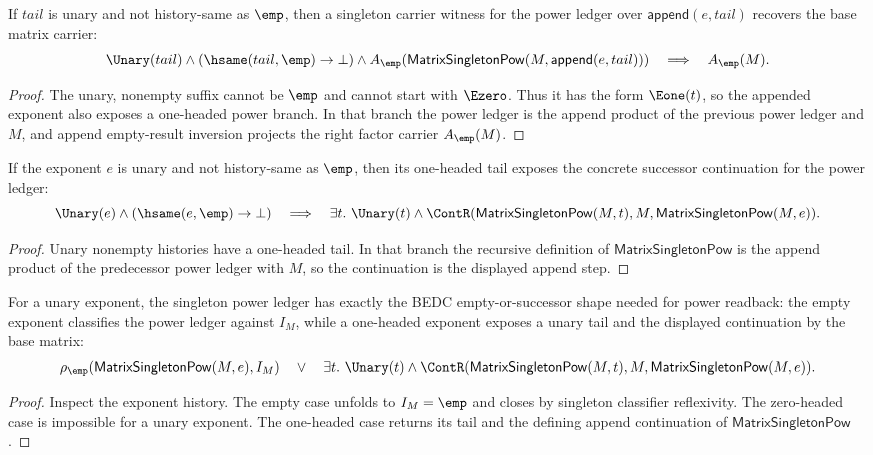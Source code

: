 \begin{theorem}
\label{thm:matrix-singleton-pow-nonempty-unary-suffix-base-carrier}
If $tail$ is unary and not history-same as $\emp$, then a singleton carrier
witness for the power ledger over $\mathsf{append}(e,tail)$ recovers the base
matrix carrier:
$$
\Unary(tail)\land(\hsame(tail,\emp)\to\bot)\land
A_{\emp}(\mathsf{MatrixSingletonPow}(M,\mathsf{append}(e,tail)))
\quad\Longrightarrow\quad
A_{\emp}(M).
$$
\end{theorem}
\begin{proof}
The unary, nonempty suffix cannot be $\emp$ and cannot start with $\Ezero$.
Thus it has the form $\Eone(t)$, so the appended exponent also exposes a
one-headed power branch. In that branch the power ledger is the append product
of the previous power ledger and $M$, and append empty-result inversion
projects the right factor carrier $A_{\emp}(M)$.
\end{proof}

\begin{theorem}
\label{thm:matrix-singleton-pow-positive-exponent-cont-readback}
If the exponent $e$ is unary and not history-same as $\emp$, then its
one-headed tail exposes the concrete successor continuation for the power
ledger:
$$
\Unary(e)\land(\hsame(e,\emp)\to\bot)
\quad\Longrightarrow\quad
\exists t.\ \Unary(t)\land
\ContR(\mathsf{MatrixSingletonPow}(M,t),M,\mathsf{MatrixSingletonPow}(M,e)).
$$
\end{theorem}
\begin{proof}
Unary nonempty histories have a one-headed tail. In that branch the recursive
definition of $\mathsf{MatrixSingletonPow}$ is the append product of the
predecessor power ledger with $M$, so the continuation is the displayed append
step.
\end{proof}

\begin{theorem}
\label{thm:matrix-singleton-pow-unary-exponent-cases}
For a unary exponent, the singleton power ledger has exactly the BEDC
empty-or-successor shape needed for power readback: the empty exponent
classifies the power ledger against \(I_M\), while a one-headed exponent
exposes a unary tail and the displayed continuation by the base matrix:
$$
\rho_{\emp}(\mathsf{MatrixSingletonPow}(M,e),I_M)
\quad\vee\quad
\exists t.\ \Unary(t)\land
\ContR(\mathsf{MatrixSingletonPow}(M,t),M,\mathsf{MatrixSingletonPow}(M,e)).
$$
\end{theorem}
\begin{proof}
Inspect the exponent history. The empty case unfolds to \(I_M=\emp\) and
closes by singleton classifier reflexivity. The zero-headed case is impossible
for a unary exponent. The one-headed case returns its tail and the defining
append continuation of \(\mathsf{MatrixSingletonPow}\).
\end{proof}

